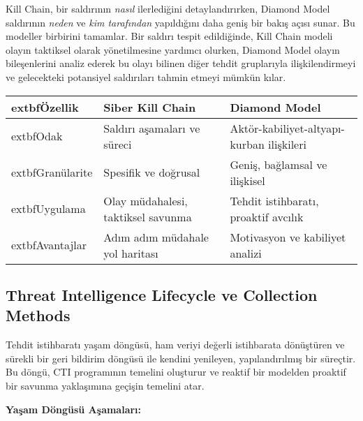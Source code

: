 Kill Chain, bir saldırının \textit{nasıl} ilerlediğini detaylandırırken, Diamond Model saldırının \textit{neden} ve \textit{kim tarafından} yapıldığını daha geniş bir bakış açısı sunar. Bu modeller birbirini tamamlar. Bir saldırı tespit edildiğinde, Kill Chain modeli olayın taktiksel olarak yönetilmesine yardımcı olurken, Diamond Model olayın bileşenlerini analiz ederek bu olayı bilinen diğer tehdit gruplarıyla ilişkilendirmeyi ve gelecekteki potansiyel saldırıları tahmin etmeyi mümkün kılar.

\begin{longtable}{|p{3cm}|p{5.5cm}|p{5.5cm}|}
\hline
    	extbf{Özellik} & \textbf{Siber Kill Chain} & \textbf{Diamond Model} \\
\hline
    	extbf{Odak} & Saldırı aşamaları ve süreci & Aktör-kabiliyet-altyapı-kurban ilişkileri \\
\hline
    	extbf{Granülarite} & Spesifik ve doğrusal & Geniş, bağlamsal ve ilişkisel \\
\hline
    	extbf{Uygulama} & Olay müdahalesi, taktiksel savunma & Tehdit istihbaratı, proaktif avcılık \\
\hline
    	extbf{Avantajlar} & Adım adım müdahale yol haritası & Motivasyon ve kabiliyet analizi \\
\hline
\end{longtable}

\subsection{Threat Intelligence Lifecycle ve Collection Methods}

Tehdit istihbaratı yaşam döngüsü, ham veriyi değerli istihbarata dönüştüren ve sürekli bir geri bildirim döngüsü ile kendini yenileyen, yapılandırılmış bir süreçtir. Bu döngü, CTI programının temelini oluşturur ve reaktif bir modelden proaktif bir savunma yaklaşımına geçişin temelini atar.

\textbf{Yaşam Döngüsü Aşamaları:}


